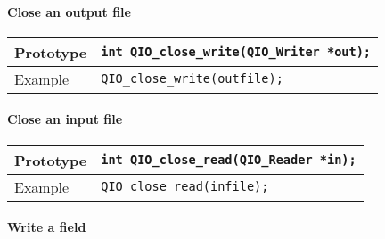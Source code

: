 \documentclass{article}
\begin{document}
\paragraph{Close an output file}

\begin{flushleft}
  \begin{tabular}{|l|l|}
  \hline
  Prototype      & \verb|int QIO_close_write(QIO_Writer *out);| \\
\hline
  Example  & \verb|QIO_close_write(outfile);|\\
   \hline
 \end{tabular}
\end{flushleft}

\paragraph{Close an input file}

\begin{flushleft}
  \begin{tabular}{|l|l|}
  \hline
  Prototype      & \verb|int QIO_close_read(QIO_Reader *in);| \\
\hline
  Example  & \verb|QIO_close_read(infile);|\\
   \hline
 \end{tabular}
\end{flushleft}


\paragraph{Write a field}
\end{document}
